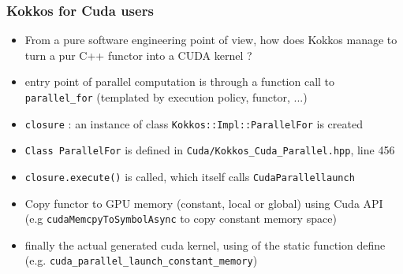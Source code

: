 \begin{frame}
  \frametitle{Kokkos for Cuda users}

  \begin{itemize}
  \item From a pure software engineering point of view, how does Kokkos manage to turn a pur C++ functor into a CUDA kernel ?
  \item entry point of parallel computation is through a function call to \texttt{parallel\_for} (templated by execution policy, functor, ...)
  \item \texttt{closure} : an instance of class \texttt{Kokkos::Impl::ParallelFor} is created
  \item \texttt{Class ParallelFor} is defined in \texttt{Cuda/Kokkos\_Cuda\_Parallel.hpp}, line 456
  \item \texttt{closure.execute()} is called, which itself calls \texttt{CudaParallellaunch}
  \item Copy functor to GPU memory (constant, local or global) using Cuda API (e.g \texttt{cudaMemcpyToSymbolAsync} to copy constant memory space)
  \item finally the actual generated cuda kernel, using of the static function define (e.g. \texttt{cuda\_parallel\_launch\_constant\_memory})
  \end{itemize}

\end{frame}
